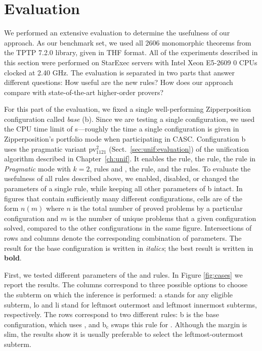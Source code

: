 \section{Evaluation} 
\label{sect:bool:eval}

We performed an extensive evaluation to determine the  usefulness of our approach. As
our benchmark set, we used all 2606 monomorphic theorems from the TPTP 7.2.0 library,
given in THF format. All of the experiments described in this section were
performed on StarExec \cite{sst-14-starexec} servers with Intel Xeon E5-2609 0 CPUs clocked at 2.40 GHz. The evaluation is separated in two parts that
answer different questions: How useful are the new rules? How 
does our approach compare with state-of-the-art higher-order provers?

For this part of the evaluation, we fixed a single well-perform\-ing Zipperposition configuration
called \emph{base} (b). Since we are testing a single configuration, we
used the CPU time limit of  s---roughly the time a single configuration is
given in Zipperposition's portfolio mode when participating in CASC. Configuration {b} uses the pragmatic variant
pv$_{1121}^{2}$ (Sect.~\ref{sec:unif:evaluation}) of the unification algorithm described in Chapter~\ref{ch:unif}. 
It enables the  rule,
the  rule, the  rule in \emph{Pragmatic} mode with $k=2$,
rules  and , the  rule, and the  rules. 
To evaluate the usefulness of
all rules described above, we enabled, disabled, or changed the
parameters of a single rule, while keeping all other parameters of b intact. 
In figures that contain sufficiently many different configurations, cells are of the form $n (m)$ where $n$ is the total
number of proved problems by a particular configuration and $m$ is the number of
unique problems that a given configuration solved, compared to the other
configurations in the same figure. Intersections of rows and columns
denote the corresponding combination of parameters.
The result for the base configuration is written in \emph{italics}; the best result
is written in \textbf{bold}.

First, we tested different parameters of the  and 
rules. In Figure \ref{fig:cases} we report the results. The columns correspond to
three possible options to choose the subterm on which the inference is performed:
{a} stands for any eligible subterm, {lo} and {li} stand
for leftmost outermost and leftmost innermost subterms, respectively. The rows
correspond to two different rules: 
{b} is the base configuration, which uses , and {b$_\text{c}$}
swaps this rule for . Although the margin is slim, the results show it is usually preferable to select the leftmost-outermost
subterm.

